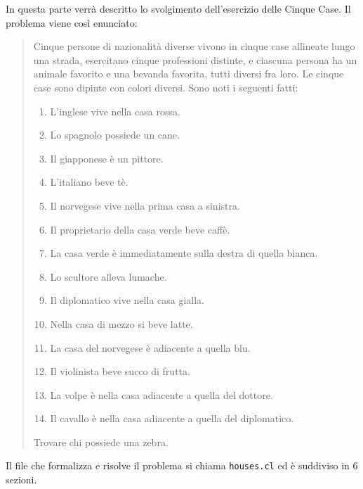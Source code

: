 In questa parte verrà descritto lo svolgimento dell'esercizio delle Cinque Case.
Il problema viene così enunciato:
\small{\begin{quote}
    Cinque persone di nazionalità diverse vivono in cinque case allineate lungo una
    strada, esercitano cinque professioni distinte, e ciascuna persona ha un animale favorito e una
    bevanda favorita, tutti diversi fra loro. Le cinque case sono dipinte con colori diversi. Sono noti i
    seguenti fatti:
    \begin{enumerate}
        \item{L’inglese vive nella casa rossa.}
        \item{Lo spagnolo possiede un cane.}
        \item{Il giapponese è un pittore.}
        \item{L’italiano beve tè.}
        \item{Il norvegese vive nella prima casa a sinistra.}
        \item{Il proprietario della casa verde beve caffè.}
        \item{La casa verde è immediatamente sulla destra di quella bianca.}
        \item{Lo scultore alleva lumache.}
        \item{Il diplomatico vive nella casa gialla.}
        \item{Nella casa di mezzo si beve latte.}
        \item{La casa del norvegese è adiacente a quella blu.}
        \item{Il violinista beve succo di frutta.}
        \item{La volpe è nella casa adiacente a quella del dottore.}
        \item{Il cavallo è nella casa adiacente a quella del diplomatico.}
    \end{enumerate}
    Trovare chi possiede una zebra.
\end{quote}}
Il file che formalizza e risolve il problema si chiama \texttt{houses.cl} ed è suddiviso in 6 sezioni.
